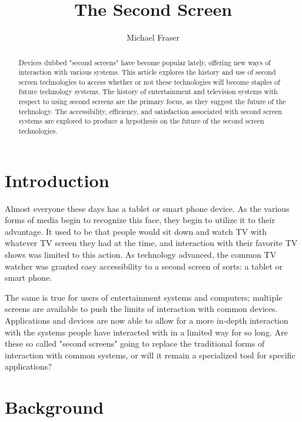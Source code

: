 \documentclass[11pt, oneside]{article}
\begin{document}
\title{The Second Screen}
\author{Michael Fraser}
\maketitle

\begin{abstract}
Devices dubbed "second screens" have become popular lately, offering new ways of interaction with various systems. This article explores the history and use of second screen technologies to access whether or not these technologies will become staples of future technology systems. The history of entertainment and television systems with respect to using second screens are the primary focus, as they suggest the future of the technology. The accessibility, efficiency, and satisfaction associated with second screen systems are explored to produce a hypothesis on the future of the second screen technologies.
\end{abstract}

\tableofcontents

\section{Introduction}
Almost everyone these days has a tablet or smart phone device. As the various forms of media begin to recognize this face, they begin to utilize it to their advantage. It used to be that people would sit down and watch TV with whatever TV screen they had at the time, and interaction with their favorite TV shows was limited to this action. As technology advanced, the common TV watcher was granted easy accessibility to a second screen of sorts: a tablet or smart phone. 

The same is true for users of entertainment systems and computers; multiple screens are available to push the limits of interaction with common devices. Applications and devices are now able to allow for a more in-depth interaction with the systems people have interacted with in a limited way for so long. Are these so called "second screens" going to replace the traditional forms of interaction with common systems, or will it remain a specialized tool for specific applications?

\section{Background}
\end{document}
